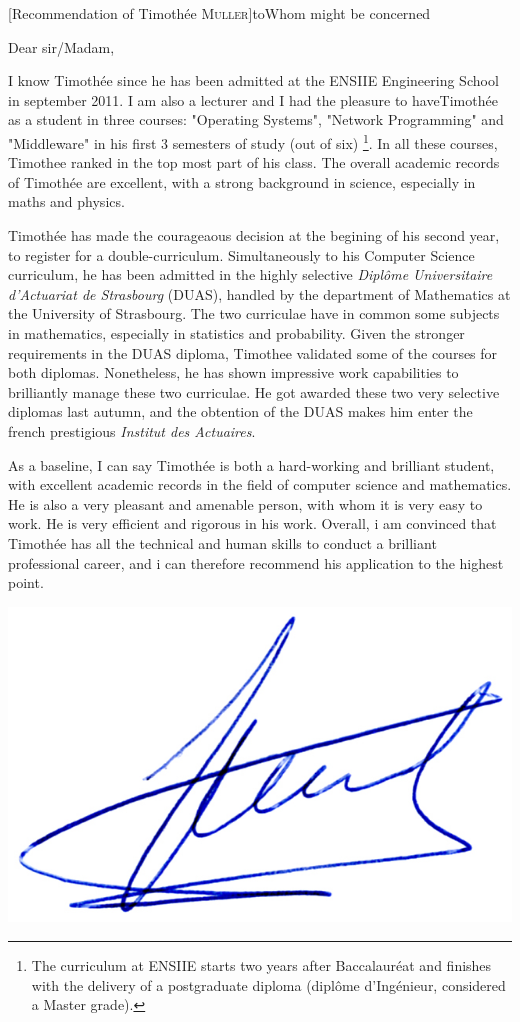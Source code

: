 \documentclass[a4paper,10pt]{article}
\begin{document}

\begin{letter}[Recommendation of Timothée \textsc{Muller}]{to}{Whom might be concerned}

Dear sir/Madam, 

I know Timothée since  he has been admitted at the  ENSIIE Engineering School in
september 2011.  I am also a lecturer  and I had the pleasure to haveTimothée as
a  student in  three  courses: "Operating  Systems",  "Network Programming"  and
"Middleware"  in his  first  3 semesters  of study  (out  of six)%
\footnote{The
  curriculum at ENSIIE starts two years after Baccalauréat and finishes with the
  delivery of a  postgraduate diploma (diplôme d'Ingénieur,  considered a Master
  grade).}.  In all  these courses, Timothee ranked  in the top most  part of his
class. The  overall academic records  of Timothée  are excellent, with  a strong
background in science, especially in maths and physics.


Timothée has made  the courageaous decision at the begining  of his second year,
to register  for a  double-curriculum.  Simultaneously  to his  Computer Science
curriculum,  he  has  been  admitted   in  the  highly  selective  \emph{Diplôme
  Universitaire d'Actuariat de Strasbourg} (DUAS),  handled by the department of
Mathematics at the University of Strasbourg.   The two curriculae have in common
some subjects in  mathematics, especially in statistics  and probability.  Given
the stronger  requirements in the DUAS  diploma, Timothee validated some  of the
courses  for  both   diplomas.   Nonetheless,  he  has   shown  impressive  work
capabilities to  brilliantly manage these  two curriculae. He got  awarded these
two very selective diplomas last autumn, and the obtention of the DUAS makes him
enter the french prestigious \emph{Institut des Actuaires}.


As a baseline, I can say Timothée  is both a hard-working and brilliant student,
with  excellent  academic   records  in  the  field  of   computer  science  and
mathematics. He  is also a  very pleasant and amenable  person, with whom  it is
very easy to work. He is very efficient  and rigorous in his work. Overall, i am
convinced that  Timothée has  all the  technical and human  skills to  conduct a
brilliant professional career, and i  can therefore recommend his application to
the highest point.


\end{letter}
\begin{flushright}
\includegraphics[width=.26\textwidth]{signgenaud.jpg}
\end{flushright}
%
\end{document}
